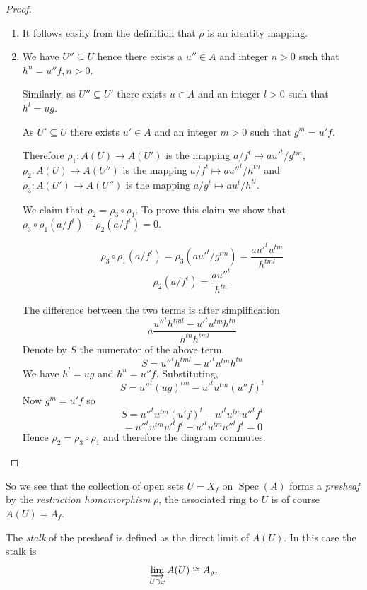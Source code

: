 \documentclass[]{report}
\DeclareMathOperator\Spec{Spec}
\newcommand\mfk[1]{\mathfrak{#1}}
\begin{document}
\begin{proof}
    \begin{enumerate}
        \item It follows easily from the definition that $\rho$ is an identity mapping. 
        \item We have $U'' \subseteq U$ hence there exists a $u'' \in A$ and integer $n>0$ such that $h^n = u''f, n>0$.

            Similarly, as $U'' \subseteq U'$ there exists $u \in A$ and an integer $l > 0$ such that $h^l = ug$. 

            As $U' \subseteq U$ there exists $u' \in A$ and an integer $m > 0$ such that $g^m = u'f$.

            Therefore $\rho_1 : A(U) \rightarrow A(U')$ is the mapping $a/f^t \mapsto a{u'}^t/g^{tm}$, $\rho_2: A(U) \rightarrow A(U'')$ is the mapping $a/f^t \mapsto a{u''}^t/h^{tn}$ and $\rho_3: A(U') \rightarrow A(U'')$ is the mapping $a/g^t \mapsto au^t/h^{tl}$.

            We claim that $\rho_2 = \rho_3 \circ \rho_1$. To prove this claim we show that $\rho_3 \circ \rho_1 (a/f^t) - \rho_2(a/f^t) = 0$.

            $$\rho_3 \circ \rho_1 (a/f^t) = \rho_3(a{u'}^t/g^{tm}) = \frac{a{u'}^t u^{tm}}{h^{tml}}$$
            $$\rho_2(a/f^t) = \frac{a{u''}^t}{h^{tn}}$$
            
        The difference between the two terms is after simplification
        $$a\frac{{u''}^t h^{tml} - {u'}^t u^{tm} h^{tn}}{h^{tn} h^{tml}}$$
        Denote by $S$ the numerator of the above term. 
        $$S = {u''}^t h^{tml} - {u'}^t u^{tm} h^{tn}$$
        We have $h^l = ug$ and $h^n = u''f$. Substituting,
        $$S = {u''}^t (ug)^{tm} - {u'}^t u^{tm} (u''f)^t$$
        Now $g^m = u'f$ so 
        $$S = {u''}^t u^{tm} (u'f)^t - {u'}^t u^{tm} {u''}^t f^t$$
        $$= {u''}^t u^{tm} {u'}^t f^t - {u'}^t u^{tm} {u''}^t f^t = 0$$
        Hence $\rho_2 = \rho_3 \circ \rho_1$ and therefore the diagram commutes.
    \end{enumerate}
\end{proof}

So we see that the collection of open sets $U = X_f$ on $\Spec(A)$ forms a \textit{presheaf} by the \textit{restriction homomorphism} $\rho$, the associated ring to $U$ is of course $A(U) = A_f$.

The \textit{stalk} of the presheaf is defined as the direct limit of $A(U)$. In this case the stalk is
    $$\varinjlim_{U \ni x} A(U) \cong A_\mfk{p}.$$
\end{document}
